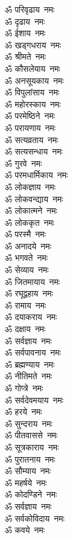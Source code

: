 \begin{multicols}{2}
\begin{flushleft}
ॐ परिवृढाय~नमः\\
ॐ दृढाय~नमः\\
ॐ ईशाय~नमः\\
ॐ खड्गधराय~नमः\\
ॐ श्रीमते~नमः\\
ॐ कौसलेयाय~नमः\\
ॐ अनसूयकाय~नमः\\
ॐ विपुलांसाय~नमः\\
ॐ महोरस्काय~नमः\\
ॐ परमेष्ठिने~नमः\hfill{}\\
ॐ परायणाय~नमः\\
ॐ सत्यव्रताय~नमः\\
ॐ सत्यसन्धाय~नमः\\
ॐ गुरवे~नमः\\
ॐ परमधार्मिकाय~नमः\\
ॐ लोकज्ञाय~नमः\\
ॐ लोकवन्द्याय~नमः\\
ॐ लोकात्मने~नमः\\
ॐ लोककृत~नमः\\
ॐ परस्मै~नमः\hfill{}\\
ॐ अनादये~नमः\\
ॐ भगवते~नमः\\
ॐ सेव्याय~नमः\\
ॐ जितमायाय~नमः\\
ॐ रघूद्वहाय~नमः\\
ॐ रामाय~नमः\\
ॐ दयाकराय~नमः\\
ॐ दक्षाय~नमः\\
ॐ सर्वज्ञाय~नमः\\
ॐ सर्वपावनाय~नमः\hfill{}\\
ॐ ब्रह्मण्याय~नमः\\
ॐ नीतिमते~नमः\\
ॐ गोप्त्रे~नमः\\
ॐ सर्वदेवमयाय~नमः\\
ॐ हरये~नमः\\
ॐ सुन्दराय~नमः\\
ॐ पीतवाससे~नमः\\
ॐ सूत्रकाराय~नमः\\
ॐ पुरातनाय~नमः\\
ॐ सौम्याय~नमः\hfill{}\\
ॐ महर्षये~नमः\\
ॐ कोदण्डिने~नमः\\
ॐ सर्वज्ञाय~नमः\\
ॐ सर्वकोविदाय~नमः\\
ॐ कवये~नमः\\

\end{flushleft}
\end{multicols}
